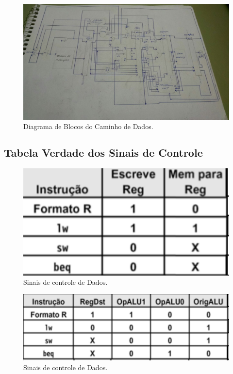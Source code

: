 \documentclass[12pt]{article}
\begin{document}
\begin{figure}[H]
	\flushleft
	\includegraphics[width=1\textwidth]{pipe.jpg}
	\caption{Diagrama de Blocos do Caminho de Dados.}
	\label{fig:pipe}
\end{figure}

\subsection{Tabela Verdade dos Sinais de Controle}

\begin{figure}[H]
	\flushleft
	\includegraphics[width=1\textwidth]{escrita.png}
	\caption{Sinais de controle de Dados.}
	\label{fig:escrita}
\end{figure}

\begin{figure}[H]
	\flushleft
	\includegraphics[width=1\textwidth]{ex.png}
	\caption{Sinais de controle de Dados.}
	\label{fig:ex}
\end{figure}
\end{document}
